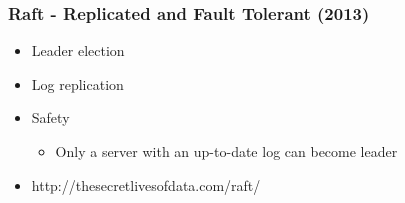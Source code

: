 \documentclass[12pt]{beamer}
\begin{document}
        \begin{frame}
            \begin{center}
                \frametitle{Raft - Replicated and Fault Tolerant (2013)}
                \begin{itemize}
                    \item Leader election
                    \item Log replication
                    \item Safety
                    \begin{itemize}
                        \item Only a server with an up-to-date log can become leader
                    \end{itemize}
                    \item http://thesecretlivesofdata.com/raft/
                \end{itemize}
            \end{center}
        \end{frame}
    
    
\end{document}
